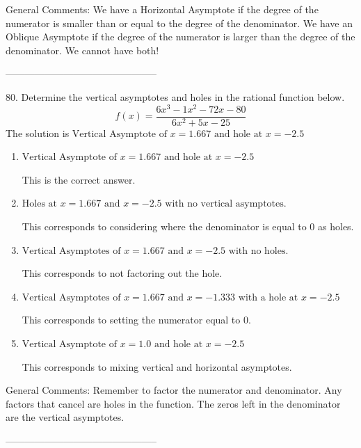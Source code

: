 \documentclass{extbook}[14pt]
\begin{document}
General Comments: We have a Horizontal Asymptote if the degree of the numerator is smaller than or equal to the degree of the denominator. We have an Oblique Asymptote if the degree of the numerator is larger than the degree of the denominator. We cannot have both!

-----------------------------------------------

80. Determine the vertical asymptotes and holes in the rational function below.
\[ f(x) = \frac{6x^{3} -1 x^{2} -72 x -80}{6x^{2} +5 x -25} \] 
The solution is $ \text{Vertical Asymptote of } x = 1.667 \text{ and hole at } x = -2.5 $ 

\begin{enumerate}[label=\Alph*.] 
\item $ \text{Vertical Asymptote of } x = 1.667 \text{ and hole at } x = -2.5 $ 

 This is the correct answer. 
\item $ \text{Holes at } x = 1.667 \text{ and } x = -2.5 \text{ with no vertical asymptotes.} $ 

 This corresponds to considering where the denominator is equal to 0 as holes. 
\item $ \text{Vertical Asymptotes of } x = 1.667 \text{ and } x = -2.5 \text{ with no holes.} $ 

 This corresponds to not factoring out the hole. 
\item $ \text{Vertical Asymptotes of } x = 1.667 \text{ and } x = -1.333 \text{ with a hole at } x = -2.5 $ 

 This corresponds to setting the numerator equal to 0. 
\item $ \text{Vertical Asymptote of } x = 1.0 \text{ and hole at } x = -2.5 $ 

 This corresponds to mixing vertical and horizontal asymptotes. 
\end{enumerate} 
 
General Comments: Remember to factor the numerator and denominator. Any factors that cancel are holes in the function. The zeros left in the denominator are the vertical asymptotes.

-----------------------------------------------
\end{document}
